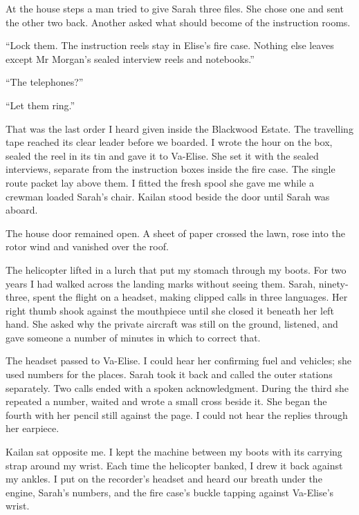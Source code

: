 At the house steps a man tried to give Sarah three files. She chose one and sent the other two back. Another asked what should become of the instruction rooms.\par

``Lock them. The instruction reels stay in Elise's fire case. Nothing else leaves except Mr Morgan's sealed interview reels and notebooks.''\par

``The telephones?''\par

``Let them ring.''\par

That was the last order I heard given inside the Blackwood Estate. The travelling tape reached its clear leader before we boarded. I wrote the hour on the box, sealed the reel in its tin and gave it to Va-Elise. She set it with the sealed interviews, separate from the instruction boxes inside the fire case. The single route packet lay above them. I fitted the fresh spool she gave me while a crewman loaded Sarah's chair. Kailan stood beside the door until Sarah was aboard.\par

The house door remained open. A sheet of paper crossed the lawn, rose into the rotor wind and vanished over the roof.\par

The helicopter lifted in a lurch that put my stomach through my boots. For two years I had walked across the landing marks without seeing them. Sarah, ninety-three, spent the flight on a headset, making clipped calls in three languages. Her right thumb shook against the mouthpiece until she closed it beneath her left hand. She asked why the private aircraft was still on the ground, listened, and gave someone a number of minutes in which to correct that.\par

The headset passed to Va-Elise. I could hear her confirming fuel and vehicles; she used numbers for the places. Sarah took it back and called the outer stations separately. Two calls ended with a spoken acknowledgment. During the third she repeated a number, waited and wrote a small cross beside it. She began the fourth with her pencil still against the page. I could not hear the replies through her earpiece.\par

Kailan sat opposite me. I kept the machine between my boots with its carrying strap around my wrist. Each time the helicopter banked, I drew it back against my ankles. I put on the recorder's headset and heard our breath under the engine, Sarah's numbers, and the fire case's buckle tapping against Va-Elise's wrist.\par

